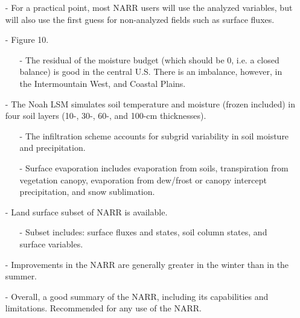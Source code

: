 \documentclass[12pt, letterpaper]{article}
\begin{document}
\begin{itemize}
        \item[-] For a practical point, most NARR users will use the analyzed variables, but will also
                 use the first guess for non-analyzed fields such as surface fluxes.
        \item[-] Figure 10.
        \begin{itemize}
        	\item[-] The residual of the moisture budget (which should be 0, i.e. a closed balance) is
        	         good in the central U.S. There is an imbalance, however, in the Intermountain West,
        	         and Coastal Plains.
        \end{itemize}
        \item[-] The Noah LSM simulates soil temperature and moisture (frozen included) in four soil
                 layers (10-, 30-, 60-, and 100-cm thicknesses).
        \begin{itemize}
        	\item[-] The infiltration scheme accounts for subgrid variability in soil moisture and
        	         precipitation.
        	\item[-] Surface evaporation includes evaporation from soils, transpiration from vegetation
        	         canopy, evaporation from dew/frost or canopy intercept precipitation, and snow
        	         sublimation.
        \end{itemize}
        \item[-] Land surface subset of NARR is available.
        \begin{itemize}
        	\item[-] Subset includes: surface fluxes and states, soil column states, and surface variables.
        \end{itemize}
        \item[-] Improvements in the NARR are generally greater in the winter than in the summer.
        \item[-] Overall, a good summary of the NARR, including its capabilities and limitations. 
                 Recommended for any use of the NARR.
    \end{itemize}
\end{document}
